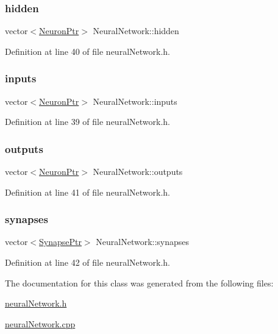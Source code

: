 \subsubsection{\texorpdfstring{hidden}{hidden}}
{\footnotesize\ttfamily vector$<$\hyperlink{neural_network_8h_af4884b0194f2598e689c894b76d0d92c}{Neuron\+Ptr}$>$ Neural\+Network\+::hidden}



Definition at line 40 of file neural\+Network.\+h.

\mbox{\label{class_neural_network_ae9ab96e97eef53bf8080001cf90075b8}} 
\subsubsection{\texorpdfstring{inputs}{inputs}}
{\footnotesize\ttfamily vector$<$\hyperlink{neural_network_8h_af4884b0194f2598e689c894b76d0d92c}{Neuron\+Ptr}$>$ Neural\+Network\+::inputs}



Definition at line 39 of file neural\+Network.\+h.

\mbox{\label{class_neural_network_aa921b31f56ca042113bf250d603dabcd}} 
\subsubsection{\texorpdfstring{outputs}{outputs}}
{\footnotesize\ttfamily vector$<$\hyperlink{neural_network_8h_af4884b0194f2598e689c894b76d0d92c}{Neuron\+Ptr}$>$ Neural\+Network\+::outputs}



Definition at line 41 of file neural\+Network.\+h.

\mbox{\label{class_neural_network_aa22ab04ac7e5b3bb8f291ff524e04ee3}} 
\subsubsection{\texorpdfstring{synapses}{synapses}}
{\footnotesize\ttfamily vector$<$\hyperlink{neural_network_8h_ac587b5c69519c070958c5cb318ddc50f}{Synapse\+Ptr}$>$ Neural\+Network\+::synapses}



Definition at line 42 of file neural\+Network.\+h.



The documentation for this class was generated from the following files\+:\begin{DoxyCompactItemize}
\item 
\hyperlink{neural_network_8h}{neural\+Network.\+h}\item 
\hyperlink{neural_network_8cpp}{neural\+Network.\+cpp}\end{DoxyCompactItemize}

